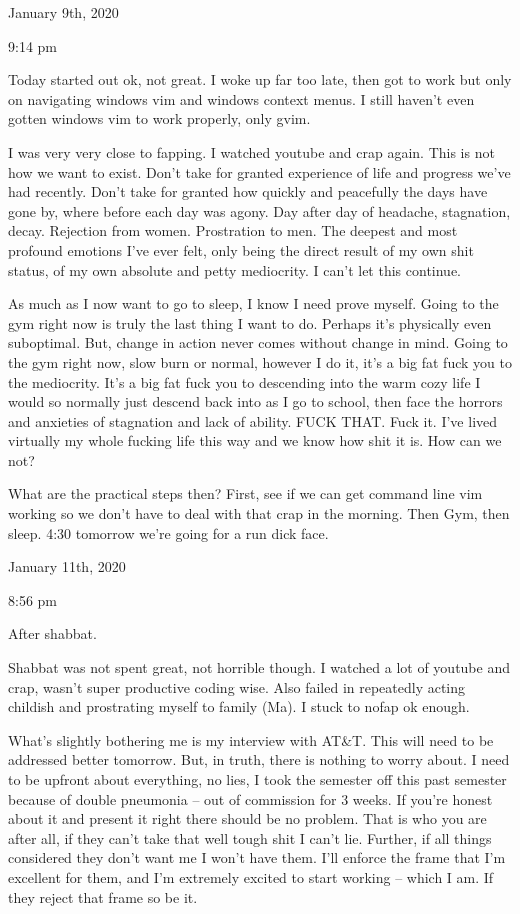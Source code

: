 \bigskip
\bigskip
January 9th, 2020

9:14 pm

Today started out ok, not great. I woke up far too late, then got to
work but only on navigating windows vim and windows context menus. I
still haven't even gotten windows vim to work properly, only gvim.

I was very very close to fapping. I watched youtube and crap again. This
is not how we want to exist. Don't take for granted experience of life
and progress we've had recently. Don't take for granted how quickly and
peacefully the days have gone by, where before each day was agony. Day
after day of headache, stagnation, decay. Rejection from women.
Prostration to men. The deepest and most profound emotions I've ever
felt, only being the direct result of my own shit status, of my own
absolute and petty mediocrity. I can't let this continue.

As much as I now want to go to sleep, I know I need prove myself. Going
to the gym right now is truly the last thing I want to do. Perhaps it's
physically even suboptimal. But, change in action never comes without
change in mind. Going to the gym right now, slow burn or normal, however
I do it, it's a big fat fuck you to the mediocrity. It's a big fat fuck
you to descending into the warm cozy life I would so normally just
descend back into as I go to school, then face the horrors and anxieties
of stagnation and lack of ability. FUCK THAT. Fuck it. I've lived
virtually my whole fucking life this way and we know how shit it is. How
can we not?

What are the practical steps then? First, see if we can get command line
vim working so we don't have to deal with that crap in the morning. Then
Gym, then sleep. 4:30 tomorrow we're going for a run dick face.

\bigskip
\bigskip
January 11th, 2020

8:56 pm

After shabbat.

Shabbat was not spent great, not horrible though. I watched a lot of
youtube and crap, wasn't super productive coding wise. Also failed in
repeatedly acting childish and prostrating myself to family (Ma). I
stuck to nofap ok enough.

What's slightly bothering me is my interview with AT\&T. This will need
to be addressed better tomorrow. But, in truth, there is nothing to
worry about. I need to be upfront about everything, no lies, I took the
semester off this past semester because of double pneumonia -- out of
commission for 3 weeks. If you're honest about it and present it right
there should be no problem. That is who you are after all, if they can't
take that well tough shit I can't lie. Further, if all things considered
they don't want me I won't have them. I'll enforce the frame that I'm
excellent for them, and I'm extremely excited to start working -- which
I am. If they reject that frame so be it.

